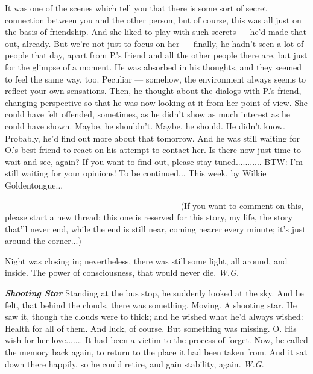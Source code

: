 It was one of the scenes which tell you that there is some sort of secret connection between you and the other person, but of course, this was all just on the basis of friendship. And she liked to play with such secrets --- he'd made that out, already. 
But we're not just to focus on her --- finally, he hadn't seen a lot of people that day, apart from P.'s friend and all the other people there are, but just for the glimpse of a moment. 
He was absorbed in his thoughts, and they seemed to feel the same way, too. 
Peculiar --- somehow, the environment always seems to reflect your own sensations. 
Then, he thought about the dialogs with P.'s friend, changing perspective so that he was now looking at it from her point of view. 
She could have felt offended, sometimes, as he didn't show as much interest as he could have shown. Maybe, he shouldn't. Maybe, he should. 
He didn't know. 
Probably, he'd find out more about that tomorrow. 
And he was still waiting for O.'s best friend to react on his attempt to contact her. 
Is there now just time to wait and see, again?
If you want to find out, please stay tuned...........
BTW: I'm still waiting for your opinions!
To be continued...
This week, by Wilkie Goldentongue...

--------------------------------------------------------------
(If you want to comment on this, please start a new thread; this one is reserved for this story, my life, the story that'll never end, while the end is still near, coming nearer every minute; it's just around the corner...)

Night was closing in; 
nevertheless, there was still some light, 
all around, 
and inside. 
The power of consciousness, 
that would never die. 
\emph{W.G.}

\emph{\textbf{Shooting Star}}
Standing at the bus stop, 
he suddenly looked at the sky. 
And he felt, that behind the clouds, 
there was something. 
Moving. 
A shooting star. 
He saw it, though the clouds were to thick; 
and he wished what he'd always wished: 
Health for all of them. 
And luck, of course. 
But something was missing. 
O. 
His wish for her love.......
It had been a victim to the process 
of forget. 
Now, he called the memory back again, 
to return 
to the place 
it had been taken from. 
And it sat down there happily, 
so he could retire, 
and gain stability, 
again. 
\emph{W.G.}

